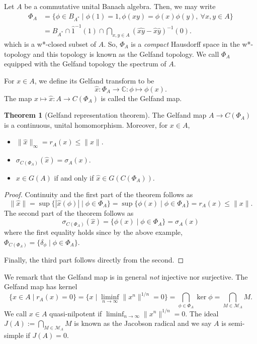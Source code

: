 \documentclass[]{article}
\theoremstyle{definition}
\newtheorem{theorem}{Theorem}
\begin{document}
Let \(A\) be a commutative unital Banach algebra. Then, we may write 
\begin{align*}
  \Phi_A & = \{\phi \in B_{A^*} \mid \phi(1) = 1, \phi(xy) = \phi(x)\phi(y),\ \forall x, y \in A\}\\
    & = B_{A^*} \cap \hat{1}^{-1}(1) \cap \bigcap_{x, y \in A} (\hat{xy} - \hat{x} \hat{y})^{-1}(0).
\end{align*}
which is a w*-closed subset of \(A\). So, \(\Phi_A\) is a \textit{compact} Hausdorff space in the w*-topology
and this topology is known as the Gelfand topology. We call \(\Phi_A\) equipped with the Gelfand 
topology the spectrum of \(A\).

For \(x \in A\), we define its Gelfand transform to be 
\[\hat x : \Phi_A \to \mathbb{C} : \phi \mapsto \phi(x).\]
The map \(x \mapsto \hat x : A \to C(\Phi_A)\) is called the Gelfand map. 

\begin{theorem}[Gelfand representation theorem]
  The Gelfand map \(A \to C(\Phi_A)\) is a continuous, unital homomorphism. Moreover, for \(x \in A\), 
  \begin{itemize}
    \item \(\|\hat x\|_\infty = r_A(x) \le \|x\|\).
    \item \(\sigma_{C(\Phi_A)}(\hat x) = \sigma_A(x)\).
    \item \(x \in G(A)\) if and only if \(\hat x \in G(C(\Phi_A))\).
  \end{itemize}
\end{theorem}
\begin{proof}
  Continuity and the first part of the theorem follows as 
  \[\|\hat x\| = \sup \{|\hat x(\phi)| \mid \phi \in \Phi_A\} = \sup \{\phi(x) \mid \phi \in \Phi_A\} = r_A(x) \le \|x\|.\]
  The second part of the theorem follows as
  \[\sigma_{C(\Phi_A)}(\hat x) = \{\phi(x) \mid \phi \in \Phi_A\} = \sigma_A(x)\]
  where the first equality holds since by the above example, \(\Phi_{C(\Phi_A)} = \{\delta_\phi \mid \phi \in \Phi_A\}\).

  Finally, the third part follows directly from the second.
\end{proof}

We remark that the Gelfand map is in general \textit{not} injective nor surjective. The Gelfand map has 
kernel 
\[\{x \in A \mid r_A(x) = 0\} = \{x \mid \liminf_{n \to \infty} \|x^n\|^{1 / n} = 0\} 
  = \bigcap_{\phi \in \Phi_A} \ker \phi = \bigcap_{M \in \mathcal{M}_A} M.\] 
We call \(x \in A\) quasi-nilpotent if \(\liminf_{n \to \infty} \|x^n\|^{1 / n} = 0\). 
The ideal \(J(A) := \bigcap_{M \in \mathcal{M}_A} M\) is known as the Jacobson radical and we say 
\(A\) is semi-simple if \(J(A) = 0\).
\end{document}
